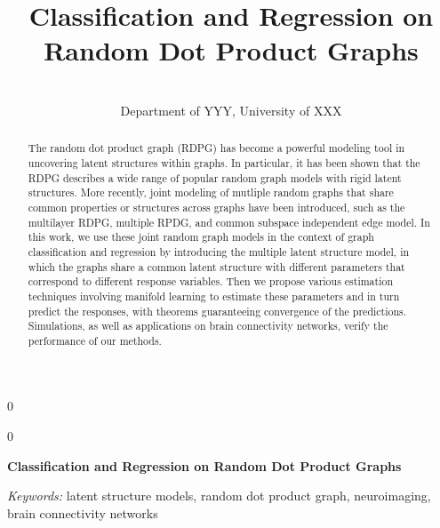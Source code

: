 \documentclass[12pt]{article}
\newcommand{\blind}{0}
\begin{document}
\def\spacingset#1{\renewcommand{\baselinestretch}%
{#1}\small\normalsize} \spacingset{1}



\blind
{
  \title{\bf Classification and Regression on Random Dot Product Graphs}

  \author{
         \\
    Department of YYY, University of XXX\\
      }
  \maketitle
} \fi

\blind
{
  \bigskip
  \bigskip
  \bigskip
  \begin{center}
    {\LARGE\bf Classification and Regression on Random Dot Product
Graphs}
  \end{center}
  \medskip
} \fi

\bigskip
\begin{abstract}
The random dot product graph (RDPG) has become a powerful modeling tool
in uncovering latent structures within graphs. In particular, it has
been shown that the RDPG describes a wide range of popular random graph
models with rigid latent structures. More recently, joint modeling of
mutliple random graphs that share common properties or structures across
graphs have been introduced, such as the multilayer RDPG, multiple RPDG,
and common subspace independent edge model. In this work, we use these
joint random graph models in the context of graph classification and
regression by introducing the multiple latent structure model, in which
the graphs share a common latent structure with different parameters
that correspond to different response variables. Then we propose various
estimation techniques involving manifold learning to estimate these
parameters and in turn predict the responses, with theorems guaranteeing
convergence of the predictions. Simulations, as well as applications on
brain connectivity networks, verify the performance of our methods.
\end{abstract}

\noindent%
{\it Keywords:} latent structure models, random dot product
graph, neuroimaging, brain connectivity networks

\vfill

\newpage
\spacingset{1.9} %
\end{document}
